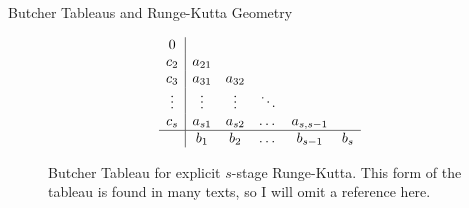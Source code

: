 \documentclass{beamer}
\begin{document}
\begin{frame}{Butcher Tableaus and Runge-Kutta Geometry}
    \begin{minipage}{0.5\linewidth}
\begin{figure}[h!]
    \begin{equation*}
        \begin{array}{ c|ccccc }
            0      &        &        &        &\\
            c_2    & a_{21} &        &        &\\
            c_3    & a_{31} & a_{32} &        &\\
            \vdots & \vdots & \vdots & \ddots &\\
            c_s    & a_{s1} & a_{s2} & \dots  & a_{s,s-1} \\
            \hline
                   & b_{1}  & b_{2}  & \dots  & b_{s-1}   & b_{s}\\
        \end{array}
    \end{equation*}
    \caption[Butcher Tableau for explicit $s$-stage Runge-Kutta] {
                Butcher Tableau for explicit $s$-stage Runge-Kutta. This form of
                the tableau is found in many texts, so I will omit a reference
                here.
    }
    \label{fig:explicitbt}
\end{figure}
    \end{minipage}%
    \begin{minipage}{0.5\linewidth}
        \begin{figure}[h]
            \centering

\end{figure}
\end{minipage}
\end{frame}
\end{document}
